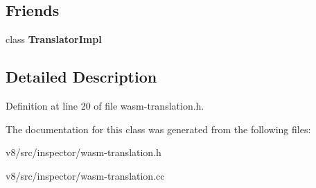\subsection*{Friends}
\begin{DoxyCompactItemize}
\item 
\mbox{\label{classv8__inspector_1_1WasmTranslation_a0f575bbb59fefda52f43a24bd713c046}} 
class {\bfseries Translator\+Impl}
\end{DoxyCompactItemize}


\subsection{Detailed Description}


Definition at line 20 of file wasm-\/translation.\+h.



The documentation for this class was generated from the following files\+:\begin{DoxyCompactItemize}
\item 
v8/src/inspector/wasm-\/translation.\+h\item 
v8/src/inspector/wasm-\/translation.\+cc\end{DoxyCompactItemize}
